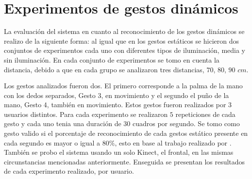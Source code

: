 

\section{Experimentos de gestos dinámicos}\label{TestDinamicGestures} 

La evaluación del sistema en cuanto al reconocimiento de los gestos dinámicos se realizo de la siguiente forma: al igual que en los gestos estáticos se hicieron dos conjuntos de experimentos cada uno con diferentes tipos de iluminación, media y sin iluminación. En cada conjunto de experimentos se tomo en cuenta la distancia, debido a que en cada grupo se analizaron tres distancias, $70$, $80$, $90$ $cm$. 

Los gestos analizados fueron dos. El primero corresponde a la palma de la mano con los dedos separados, Gesto 3, en movimiento y el segundo el puño de la mano, Gesto 4, también en movimiento. Estos gestos fueron realizados por $3$ usuarios distintos. Para cada experimento se realizaron $5$ repeticiones de cada gesto y cada uno tenia una duración de $30$ cuadros por segundo. Se tomo como gesto valido si el porcentaje de reconocimiento de cada gestos estático presente en cada segundo es mayor o igual a $80 \%$, esto en base al trabajo realizado por \citep{Sultana2012}. \\
También se probo el sistema usando un solo Kinect, el frontal, en las mismas circunstancias mencionadas anteriormente. 
Enseguida se presentan los resultados de cada experimento realizado, por usuario. 

